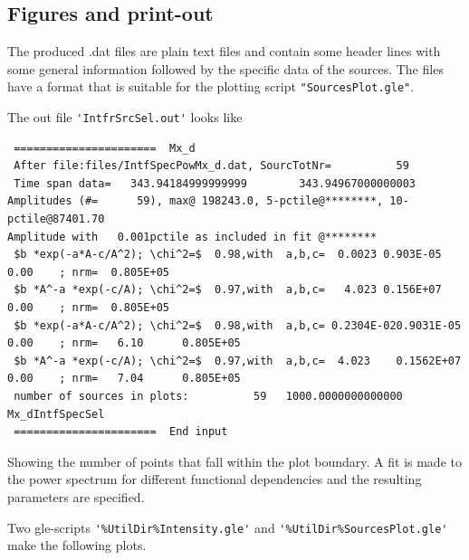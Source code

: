 \subsection{Figures and print-out}%

The produced .dat files are plain text files and contain some header lines with some general information followed by the specific data of the sources. The files have a format that is suitable for the plotting script \verb!"SourcesPlot.gle"!.

The out file \verb#'IntfrSrcSel.out'# looks like

\begin{linenumbers}
\tiny
\resetlinenumber
\begin{verbatim}
 ======================  Mx_d
 After file:files/IntfSpecPowMx_d.dat, SourcTotNr=          59
 Time span data=   343.94184999999999        343.94967000000003
Amplitudes (#=      59), max@ 198243.0, 5-pctile@********, 10-pctile@87401.70
Amplitude with   0.001pctile as included in fit @********
 $b *exp(-a*A-c/A^2); \chi^2=$  0.98,with  a,b,c=  0.0023 0.903E-05   0.00    ; nrm=  0.805E+05
 $b *A^-a *exp(-c/A); \chi^2=$  0.97,with  a,b,c=   4.023 0.156E+07   0.00    ; nrm=  0.805E+05
 $b *exp(-a*A-c/A^2); \chi^2=$  0.98,with  a,b,c= 0.2304E-020.9031E-05   0.00    ; nrm=   6.10      0.805E+05
 $b *A^-a *exp(-c/A); \chi^2=$  0.97,with  a,b,c=  4.023    0.1562E+07   0.00    ; nrm=   7.04      0.805E+05
 number of sources in plots:          59   1000.0000000000000      Mx_dIntfSpecSel
 ======================  End input
\end{verbatim}
\end{linenumbers}

Showing the number of points that fall within the plot boundary. A fit is made to the power spectrum for different functional dependencies and the resulting parameters are specified.

Two gle-scripts \verb#'%UtilDir%Intensity.gle'# and \verb#'%UtilDir%SourcesPlot.gle'# make the following plots.

